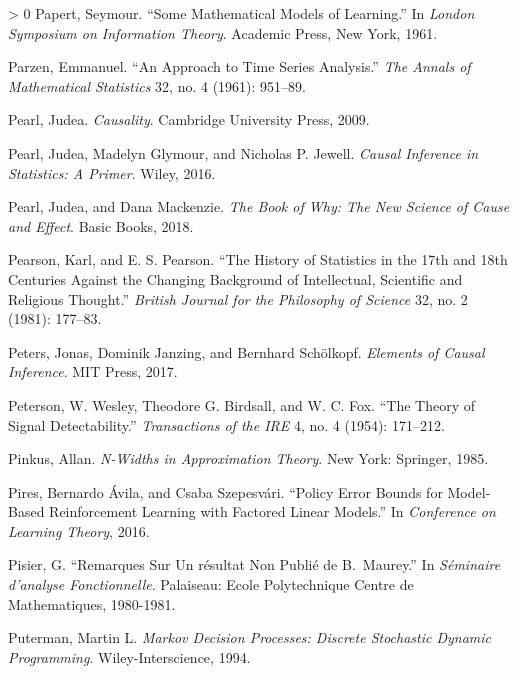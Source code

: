 \documentclass{tufte-book}
\newlength{\cslhangindent}
\newenvironment{CSLReferences}[3] %
 {%
  \setlength{\parindent}{0pt}
  \ifodd #1 \everypar{\setlength{\hangindent}{\cslhangindent}}\ignorespaces\fi
  \ifnum #2 > 0
  \setlength{\parskip}{#3\baselineskip}
  \fi
 }%
 {
 }
\begin{document}
\begin{CSLReferences}{1}{0}
\leavevmode\hypertarget{ref-papert1961some}{}%
Papert, Seymour. {``Some Mathematical Models of Learning.''} In
\emph{London Symposium on Information Theory}. Academic Press, New York,
1961.

\leavevmode\hypertarget{ref-parzen1961approach}{}%
Parzen, Emmanuel. {``An Approach to Time Series Analysis.''} \emph{The
Annals of Mathematical Statistics} 32, no. 4 (1961): 951--89.

\leavevmode\hypertarget{ref-pearl2009causality}{}%
Pearl, Judea. \emph{Causality}. Cambridge University Press, 2009.

\leavevmode\hypertarget{ref-pearl2016causal}{}%
Pearl, Judea, Madelyn Glymour, and Nicholas P. Jewell. \emph{Causal
Inference in Statistics: A Primer}. Wiley, 2016.

\leavevmode\hypertarget{ref-pearl2018book}{}%
Pearl, Judea, and Dana Mackenzie. \emph{The Book of Why: The New Science
of Cause and Effect}. Basic Books, 2018.

\leavevmode\hypertarget{ref-pearson1981history}{}%
Pearson, Karl, and E. S. Pearson. {``The History of Statistics in the
17th and 18th Centuries Against the Changing Background of Intellectual,
Scientific and Religious Thought.''} \emph{British Journal for the
Philosophy of Science} 32, no. 2 (1981): 177--83.

\leavevmode\hypertarget{ref-peters2017elements}{}%
Peters, Jonas, Dominik Janzing, and Bernhard Schölkopf. \emph{Elements
of Causal Inference}. MIT Press, 2017.

\leavevmode\hypertarget{ref-peterson1954}{}%
Peterson, W. Wesley, Theodore G. Birdsall, and W. C. Fox. {``The Theory
of Signal Detectability.''} \emph{Transactions of the {IRE}} 4, no. 4
(1954): 171--212.

\leavevmode\hypertarget{ref-PinkusBook}{}%
Pinkus, Allan. \emph{N-Widths in Approximation Theory}. New York:
Springer, 1985.

\leavevmode\hypertarget{ref-AvilaPires16}{}%
Pires, Bernardo Ávila, and Csaba Szepesvári. {``Policy Error Bounds for
Model-Based Reinforcement Learning with Factored Linear Models.''} In
\emph{Conference on Learning Theory}, 2016.

\leavevmode\hypertarget{ref-Pisier81}{}%
Pisier, G. {``Remarques Sur Un résultat Non Publié de {B}.~{M}aurey.''}
In \emph{Séminaire d'analyse Fonctionnelle}. Palaiseau: Ecole
Polytechnique Centre de Mathematiques, 1980-1981.

\leavevmode\hypertarget{ref-PutermanBook}{}%
Puterman, Martin L. \emph{Markov Decision Processes: Discrete Stochastic
Dynamic Programming}. Wiley-Interscience, 1994.


\end{CSLReferences}
\end{document}
